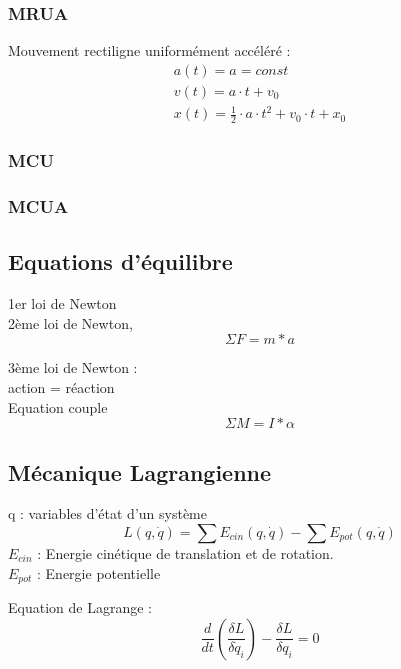 \documentclass[12pt,a4paper,twoside]{article}
\numberwithin{equation}{subsection}
\begin{document}
\subsubsection{MRUA}
Mouvement rectiligne uniformément accéléré :
\begin{eqnarray}
a(t)=a=const\\
v(t)=a \cdot t+v_0\\
x(t)=\frac{1}{2} \cdot a \cdot t^2+v_0 \cdot t + x_0
\end{eqnarray}

\subsubsection{MCU}
\subsubsection{MCUA}


\subsection{Equations d'équilibre}
1er loi de Newton \\


2ème loi de Newton, 
\begin{equation}
\Sigma F= m*a
\end{equation}

3ème loi de Newton : \\

action = réaction \\

Equation couple
\begin{equation}
\Sigma M=I*\alpha
\end{equation}

\subsection{Mécanique Lagrangienne}
q : variables d'état d'un système
\begin{equation}
L(q,\dot{q})=\sum E_{cin}(q,\dot{q}) - \sum E_{pot}(q,\dot{q})
\end{equation}
$E_{cin}$ : Energie cinétique de translation et de rotation.\\
$E_{pot}$ : Energie potentielle

Equation de Lagrange :
\begin{equation}
\frac{d}{dt}(\frac{\delta L}{\delta \dot{q}_i})-\frac{\delta L}{\delta q_i}=0
\end{equation}
\end{document}
